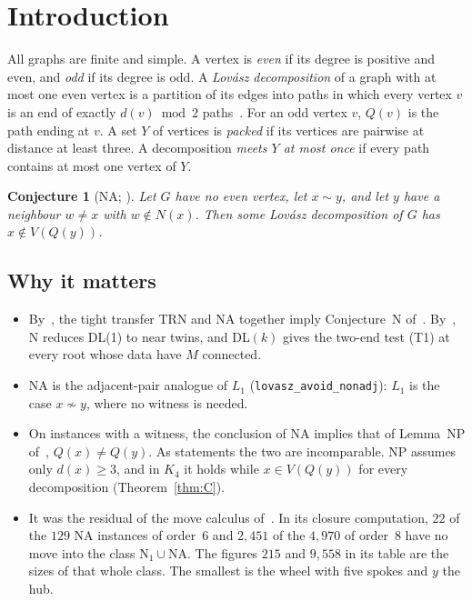 \documentclass[11pt]{amsart}
\newtheorem{conjecture}[theorem]{Conjecture}
\theoremstyle{definition}
\newcommand{\lean}[1]{\quad{\footnotesize[Lean: \texttt{#1}]}}
\begin{document}
\section{Introduction}\label{sec:intro}

All graphs are finite and simple. A vertex is \emph{even} if its degree is positive and even, and
\emph{odd} if its degree is odd. A \emph{Lov\'asz decomposition} of a graph with at most one even vertex
is a partition of its edges into paths in which every vertex $v$ is an end of exactly $d(v)\bmod2$
paths~\cite{L68}. For an odd vertex $v$, $Q(v)$ is the path ending at $v$. A set $Y$ of vertices is
\emph{packed} if its vertices are pairwise at distance at least three. A decomposition \emph{meets $Y$
at most once} if every path contains at most one vertex of $Y$.

\begin{conjecture}[NA; {\cite[Conjecture~4.2]{CN}}]\label{conj:na}
Let $G$ have no even vertex, let $x\sim y$, and let $y$ have a neighbour $w\ne x$ with $w\notin
N(x)$. Then some Lov\'asz decomposition of $G$ has $x\notin V(Q(y))$.
\lean{NeighbourAvoidOn}
\end{conjecture}

\subsection*{Why it matters}
\begin{itemize}
\item By~\cite[Theorem~4.6]{CN}, the tight transfer TRN and NA together imply Conjecture~N
of~\cite{DL}. By~\cite[Proposition~9.2]{DL}, N reduces DL(1) to near twins, and DL$(k)$ gives the
two-end test (T1) at every root whose data have $M$ connected.
\item NA is the adjacent-pair analogue of $L_1$ (\texttt{lovasz\_avoid\_nonadj}): $L_1$ is the case
$x\not\sim y$, where no witness is needed.
\item On instances with a witness, the conclusion of NA implies that of Lemma~NP of~\cite{DL},
$Q(x)\ne Q(y)$. As statements the two are incomparable. NP assumes only $d(x)\ge3$, and in $K_4$ it holds
while $x\in V(Q(y))$ for every decomposition (Theorem~\ref{thm:C}).
\item It was the residual of the move calculus of~\cite{CN}. In its closure computation, $22$ of the
$129$ NA instances of order~$6$ and $2{,}451$ of the $4{,}970$ of order~$8$ have no move into the class
N$_1\cup$NA. The figures $215$ and $9{,}558$ in its table are the sizes of that whole class.
The smallest is the wheel with five spokes and $y$ the hub.
\end{itemize}
\end{document}
